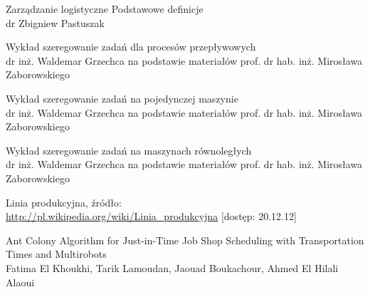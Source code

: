 \documentclass[twoside]{pracaInzynierskaMS}
\begin{document}
\begin{thebibliography}{99}

Zarządzanie logistyczne Podstawowe definicje \\
dr Zbigniew Pastuszak

Wykład szeregowanie zadań dla procesów przepływowych \\
dr inż. Waldemar Grzechca na podstawie materiałów prof. dr hab. inż. Mirosława Zaborowskiego

Wykład szeregowanie zadań na pojedynczej maszynie \\
dr inż. Waldemar Grzechca na podstawie materiałów prof. dr hab. inż. Mirosława Zaborowskiego

Wykład szeregowanie zadań na maszynach równoległych \\
dr inż. Waldemar Grzechca na podstawie materiałów prof. dr hab. inż. Mirosława Zaborowskiego

Linia produkcyjna, źródło: \\
\url{http://pl.wikipedia.org/wiki/Linia_produkcyjna} [dostęp: 20.12.12]

    Ant Colony Algorithm for Just-in-Time Job Shop Scheduling with Transportation Times and Multirobots \\
    Fatima El Khoukhi, Tarik Lamoudan, Jaouad Boukachour, Ahmed El Hilali Alaoui






\end{thebibliography}
\end{document}
